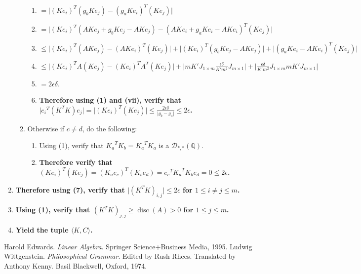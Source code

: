 \documentclass[twocolumn]{article}
\DeclareMathOperator{\disc}{disc}
\begin{document}
\begin{enumerate}
\begin{enumerate}
\begin{enumerate}
							\item $=\lvert(Ke_i)^T(g_bKe_j)-(g_aKe_i)^T(Ke_j)\rvert$
							\item $=\lvert(Ke_i)^T(AKe_j+g_bKe_j-AKe_j)-(AKe_i+g_aKe_i-AKe_i)^T(Ke_j)\rvert$
							\item $\le\lvert(Ke_i)^T(AKe_j)-(AKe_i)^T(Ke_j)\rvert+\lvert(Ke_i)^T(g_bKe_j-AKe_j)\rvert+\lvert(g_aKe_i-AKe_i)^T(Ke_j)\rvert$
							\item $\le\lvert(Ke_i)^TA(Ke_j)-(Ke_i)^TA^T(Ke_j)\rvert+\lvert mK'J_{1\times m}\frac{\epsilon\delta}{K'm^2}J_{m\times 1}\rvert+\lvert\frac{\epsilon\delta}{K'm^2}J_{1\times m}mK'J_{m\times 1}\rvert$
							\item $=2\epsilon\delta$.
							\item \textbf{Therefore using (1) and (vii), verify that $\lvert {e_i}^T(K^TK)e_j\rvert=\lvert(Ke_i)^T(Ke_j)\rvert\le\frac{2\epsilon\delta}{\lvert g_b-g_a\rvert}\le 2\epsilon$.}
						\end{enumerate}
						\item Otherwise if $c\ne d$, do the following:
						\begin{enumerate}
							\item Using (1), verify that ${K_a}^TK_b={K_a}^TK_a$ is a $\mathcal{D}_{*,*}(\mathbb{Q})$.
							\item \textbf{Therefore verify that $(Ke_i)^T(Ke_j)=(K_ae_c)^T(K_be_d)={e_c}^T{K_a}^TK_be_d=0\le 2\epsilon$.}
						\end{enumerate}
					\end{enumerate}
					\item \textbf{Therefore using (7), verify that $\lvert(K^TK)_{i,j}\rvert\le 2\epsilon$ for $1\le i\ne j\le m$.}
					\item \textbf{Using (1), verify that $(K^TK)_{j,j}\ge\disc(A)>0$ for $1\le j\le m$.}
					\item \textbf{Yield the tuple $\langle K,C\rangle$.}
				\end{enumerate}
	\begin{thebibliography}{9}
			Harold Edwards.
			\textit{Linear Algebra}. 
			Springer Science+Business Media, 1995.
			Ludwig Wittgenstein.
			\textit{Philosophical Grammar}.
			Edited by Rush Rhees.
			Translated by Anthony Kenny.
			Basil Blackwell, Oxford, 1974.
	\end{thebibliography}
\end{document}
